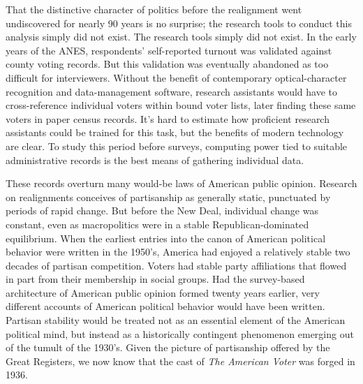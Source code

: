 \documentclass[11pt]{scrartcl}\usepackage[]{graphicx}\usepackage[]{color}
\begin{document}
That the distinctive character of politics before the realignment went undiscovered for nearly 90 years is no surprise; the research tools to conduct this analysis simply did not exist. The research tools simply did not exist. In the early years of the ANES, respondents' self-reported turnout was validated against county voting records. But this validation was eventually abandoned as too difficult for interviewers. Without the benefit of contemporary optical-character recognition and data-management software, research assistants would have to cross-reference individual voters within bound voter lists, later finding these same voters in paper census records. It's hard to estimate how proficient research assistants could be trained for this task, but the benefits of modern technology are clear.  To study this period before surveys, computing power tied to suitable administrative records is the best means of gathering individual data.

These records overturn many would-be laws of American public opinion. Research on realignments conceives of partisanship as generally static, punctuated by periods of rapid change. But before the New Deal, individual change was constant, even as macropolitics were in a stable Republican-dominated equilibrium. When the earliest entries into the canon of American political behavior were written in the 1950's, America had enjoyed a relatively stable two decades of partisan competition. Voters had stable party affiliations that flowed in part from their membership in social groups. Had the survey-based architecture of American public opinion formed twenty years earlier, very different accounts of American political behavior would have been written. Partisan stability would be treated not as an essential element of the American political mind, but instead as a historically contingent phenomenon emerging out of the tumult of the 1930's. Given the picture of partisanship offered by the Great Registers, we now know that the cast of \textit{The American Voter} was forged in 1936.




\clearpage


    
\end{document}
